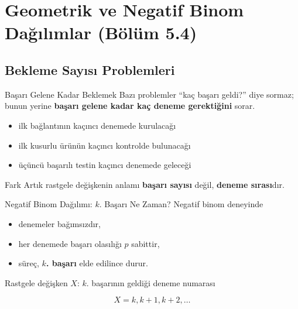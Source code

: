 \documentclass[light]{lutbeamer}
\begin{document}
\section{Geometrik ve Negatif Binom Dağılımlar (Bölüm 5.4)}
\subsection{Bekleme Sayısı Problemleri}

\begin{frame}{Başarı Gelene Kadar Beklemek}
    \small
    Bazı problemler ``kaç başarı geldi?'' diye sormaz; bunun yerine
    \textbf{başarı gelene kadar kaç deneme gerektiğini} sorar.

    \begin{itemize}
        \item ilk bağlantının kaçıncı denemede kurulacağı
        \item ilk kusurlu ürünün kaçıncı kontrolde bulunacağı
        \item üçüncü başarılı testin kaçıncı denemede geleceği
    \end{itemize}

    \begin{alertblock}{Fark}
        Artık rastgele değişkenin anlamı \textbf{başarı sayısı} değil, \textbf{deneme sırası}dır.
    \end{alertblock}
\end{frame}

\begin{frame}{Negatif Binom Dağılımı: \(k\). Başarı Ne Zaman?}
    \small
    Negatif binom deneyinde
    \begin{itemize}
        \item denemeler bağımsızdır,
        \item her denemede başarı olasılığı \(p\) sabittir,
        \item süreç, \textbf{\(k\). başarı} elde edilince durur.
    \end{itemize}

    \begin{block}{Rastgele değişken}
        \(X\): \(k\). başarının geldiği deneme numarası
    \end{block}

    \[
    X = k,k+1,k+2,\dots
    \]
\end{frame}
\end{document}
